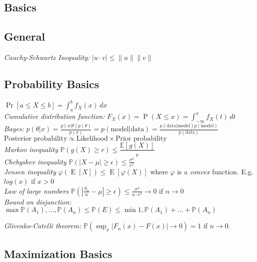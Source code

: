 \documentclass[9pt,parskip]{scrartcl}
\begin{document}
\begin{multicols*}{4}

%
%


\section*{Basics}
\subsection*{General}
\textit{Cauchy-Schwartz Inequality: }$|u\cdot v|\le \|u\|\|v\|$
\subsection*{Probability Basics}
$\Pr[a\leq X\leq b]=\int _{a}^{b}f_{X}(x)\,dx$ \\
\textit{Cumulative distribution function: } $F_{X}(x)=\operatorname {P} (X\leq x) =\int _{-\infty }^{x}f_{X}(t)\,dt$ \\
\textit{Bayes: } $p(\theta |x)={\frac {p(x|\theta )p(\theta )}{p(x)}} = p(\text{model} | \text{data} )={\frac {p( \text{data}|\text{model} )p(\text{model})}{p(\text{data})}} $ \\
$\text{Posterior probability} \propto \text{Likelihood} \times \text{Prior probability}$ \\
\textit{Markov inequality} $\mathbb{P}(g(X) \geq r) \leq \dfrac{\mathbb{E}[g(X)]}{r}$ \\
\textit{Chebyshev inequality} $\mathbb{P}(|X-\mu|\geq \epsilon) \leq \frac{\sigma^2}{\epsilon^2}$ \\
\textit{Jensen inequality} $\varphi \left(\operatorname {E} [X]\right)\leq \operatorname {E} \left[\varphi (X)\right]$ where $\varphi$ is a \textit{convex} function. E.g. $log(x)$ if $x > 0$ \\
\textit{Law of large numbers} $\mathbb{P}(|\frac{S_n}{n}-\mu|\geq \epsilon) \leq \frac{\sigma^2}{n \cdot \epsilon^2} \to 0$ if $n \to 0$ \\
\textit{Bound on disjunction: }$\max{\mathbb{P}(A_1), \dots , \mathbb{P}(A_n)} \leq \mathbb{P}(E) \leq \min{1, \mathbb{P}(A_1) + \dots + \mathbb{P}(A_n)}$

\textit{Glivenko-Catelli theorem: }$\mathbb{P}(\sup_{x} | F_{n}(x) - F(x)| \to 0)=1$ if $n \to 0$.
\subsection*{Maximization Basics}

\end{multicols*}
\end{document}
